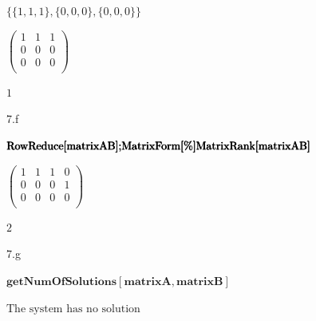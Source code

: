 \documentclass[11pt,a4paper]{article}
\begin{document}
\begin{doublespace}
\noindent\(\{\{1,1,1\},\{0,0,0\},\{0,0,0\}\}\)
\end{doublespace}

\begin{doublespace}
\noindent\(\left(
\begin{array}{ccc}
 1 & 1 & 1 \\
 0 & 0 & 0 \\
 0 & 0 & 0 \\
\end{array}
\right)\)
\end{doublespace}

\begin{doublespace}
\noindent\(1\)
\end{doublespace}

7.f\\
\begin{doublespace}
\noindent\(\pmb{\text{RowReduce}[\text{matrixAB}];}\\
\pmb{\text{MatrixForm}[\%]}\\
\pmb{\text{MatrixRank}[\text{matrixAB}]}\)
\end{doublespace}

\begin{doublespace}
\noindent\(\left(
\begin{array}{cccc}
 1 & 1 & 1 & 0 \\
 0 & 0 & 0 & 1 \\
 0 & 0 & 0 & 0 \\
\end{array}
\right)\)
\end{doublespace}

\begin{doublespace}
\noindent\(2\)
\end{doublespace}


7.g\\
\begin{doublespace}
\noindent\(\pmb{\text{getNumOfSolutions}[\text{matrixA},\text{matrixB}]}\)
\end{doublespace}

\noindent\(\text{The system has no solution}\)

\clearpage

\printbibliography

\end{document}
